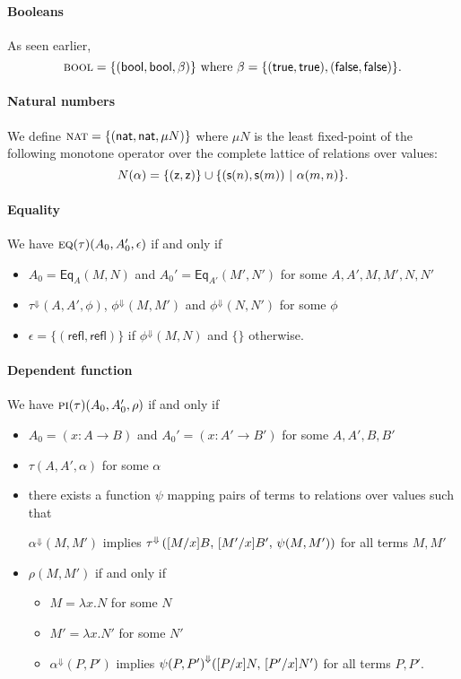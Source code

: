 \documentclass{article} \usepackage{chtt-notes} \usepackage{stmaryrd}
\newcommand{\lift}[1]{{#1}^{\Downarrow}}
\begin{document}
\paragraph{Booleans}
As seen earlier,
\[ \textsc{bool} = \{(\mathsf{bool}, \mathsf{bool}, \beta)\} \text{ where } \beta =
  \{(\mathsf{true}, \mathsf{true}), (\mathsf{false}, \mathsf{false})\}. \]

\paragraph{Natural numbers}
We define $ \textsc{nat} = \{(\mathsf{nat}, \mathsf{nat}, \mu N)\} $ where $\mu N$ is
the least fixed-point of the following monotone operator over the
complete lattice of relations over values:
\[ N(\alpha) = \{(\mathsf{z}, \mathsf{z})\} \cup \{ (\mathsf{s}(n), \mathsf{s}(m)) \ | \
  \alpha(m,n) \}. \]

\paragraph{Equality}
We have $\textsc{eq}(\tau)(A_0, A'_0, \epsilon)$ if and only if
\begin{itemize}
\item $A_0 = \textsf{Eq}_A(M, N)$ and
  $A_0' = \textsf{Eq}_{A'}(M', N')$ for some $A, A', M, M', N, N'$
\item $\lift{\tau}(A, A', \phi)$, $\lift{\phi}(M, M')$ and
  $\lift{\phi}(N, N')$ for some $\phi$
\item $\epsilon = \{(\textsf{refl}, \textsf{refl})\}$ if $\lift{\phi}(M,N)$
  and $\{\}$ otherwise.
\end{itemize}

\paragraph{Dependent function}
We have $\textsc{pi}(\tau)(A_0, A'_0, \rho)$ if and only if
\begin{itemize}
\item $A_0 = (x:A \to B)$ and $A_0' = (x:A' \to B')$ for some
  $A,A',B,B'$
\item $\tau(A, A', \alpha)$ for some $\alpha$
\item there exists a function $\psi$ mapping pairs of terms to
  relations over values such that
  \begin{center}
    $\lift{\alpha}(M, M')$ implies
    $\lift{\tau}\left(\subst{M}{x}{B}, \, \subst{M'}{x}{B'}, \,
      \psi(M,M')\right)$ for all terms $M, M'$
  \end{center}
\item $\rho(M, M')$ if and only if
  \begin{itemize}
  \item $M = \lambda x. N$ for some $N$
  \item $M' = \lambda x. N'$ for some $N'$
  \item $\lift{\alpha}(P, P')$ implies
    $\lift{\psi(P, P')}(\subst{P}{x}{N}, \, \subst{P'}{x}{N'})$ for
    all terms $P, P'$.
  \end{itemize}
\end{itemize}
\end{document}
